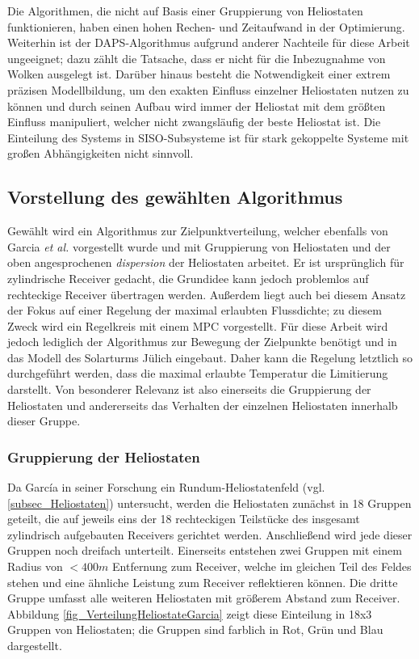 Die Algorithmen, die nicht auf Basis einer Gruppierung von Heliostaten funktionieren, haben einen hohen Rechen- und Zeitaufwand in der Optimierung.
Weiterhin ist der DAPS-Algorithmus aufgrund anderer Nachteile für diese Arbeit ungeeignet; dazu zählt die Tatsache, dass er nicht für die Inbezugnahme von Wolken ausgelegt ist.
Darüber hinaus besteht die Notwendigkeit einer extrem präzisen Modellbildung, um den exakten Einfluss einzelner Heliostaten nutzen zu können und durch seinen Aufbau wird immer der Heliostat mit dem größten Einfluss manipuliert, welcher nicht zwangsläufig der beste Heliostat ist. \cite[S. 35]{DissOberkirsch}
Die Einteilung des Systems in SISO-Subsysteme ist für stark gekoppelte Systeme mit großen Abhängigkeiten nicht sinnvoll. \cite[S. 33]{DissZanger}


\subsection{Vorstellung des gewählten Algorithmus} \label{subsec_ZielpunktregelungGarcia}
Gewählt wird ein Algorithmus zur Zielpunktverteilung, welcher ebenfalls von Garcia \textit{et al.} \cite{Garcia2} vorgestellt wurde und mit Gruppierung von Heliostaten und der oben angesprochenen \textit{dispersion} der Heliostaten arbeitet.
Er ist ursprünglich für zylindrische Receiver gedacht, die Grundidee kann jedoch problemlos auf rechteckige Receiver übertragen werden.
Außerdem liegt auch bei diesem Ansatz der Fokus auf einer Regelung der maximal erlaubten Flussdichte; zu diesem Zweck wird ein Regelkreis mit einem MPC vorgestellt.
Für diese Arbeit wird jedoch lediglich der Algorithmus zur Bewegung der Zielpunkte benötigt und in das Modell des Solarturms Jülich eingebaut.
Daher kann die Regelung letztlich so durchgeführt werden, dass die maximal erlaubte Temperatur die Limitierung darstellt.
Von besonderer Relevanz ist also einerseits die Gruppierung der Heliostaten und andererseits das Verhalten der einzelnen Heliostaten innerhalb dieser Gruppe.

\subsubsection*{Gruppierung der Heliostaten} \label{subsubsec_Gruppierung}
Da García in seiner Forschung ein Rundum-Heliostatenfeld (vgl. \ref{subsec_Heliostaten}) untersucht, werden die Heliostaten zunächst in 18 Gruppen geteilt, die auf jeweils eins der 18 rechteckigen Teilstücke des insgesamt zylindrisch aufgebauten Receivers gerichtet werden.
Anschließend wird jede dieser Gruppen noch dreifach unterteilt.
Einerseits entstehen zwei Gruppen mit einem Radius von $<400m$ Entfernung zum Receiver, welche im gleichen Teil des Feldes stehen und eine ähnliche Leistung zum Receiver reflektieren können.
Die dritte Gruppe umfasst alle weiteren Heliostaten mit größerem Abstand zum Receiver.
Abbildung \ref{fig_VerteilungHeliostateGarcia} zeigt diese Einteilung in 18x3 Gruppen von Heliostaten; die Gruppen sind farblich in Rot, Grün und Blau dargestellt. \cite[S. 8-10]{Garcia2}

